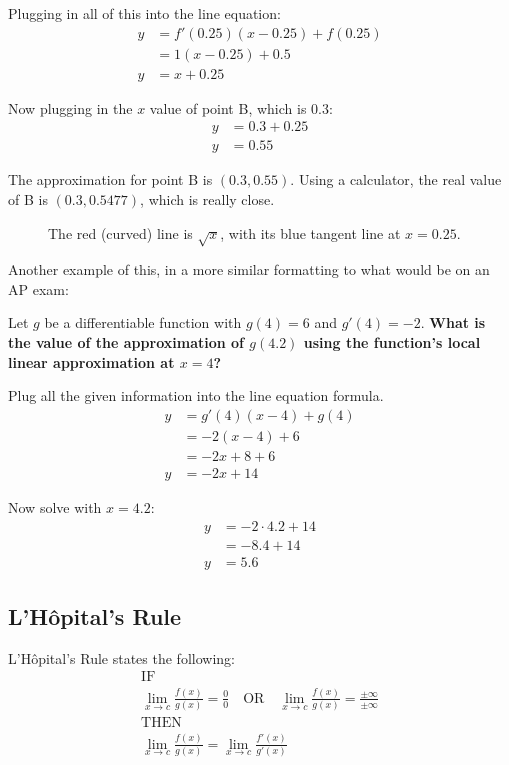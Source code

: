 \documentclass[12pt]{article}
\begin{document}
\noindent Plugging in all of this into the line equation:
\begin{align*}
    y & = f'(0.25)(x-0.25) + f(0.25) \\
      & = 1(x-0.25) + 0.5            \\
    y & = x+0.25
\end{align*}

\noindent Now plugging in the $x$ value of point B, which is $0.3$:
\begin{align*}
    y & = 0.3 + 0.25 \\
    y & = 0.55
\end{align*}

The approximation for point B is $(0.3, 0.55)$. Using a calculator, the real value of B is $(0.3, 0.5477)$, which is really close.

\begin{figure}[h]
    \begin{center}
        \caption{The red (curved) line is $\sqrt{x}$, with its blue tangent line at $x=0.25$.}
        \label{fig:locallinapprox}
    \end{center}
\end{figure}

Another example of this, in a more similar formatting to what would be on an AP exam:

\noindent Let $g$ be a differentiable function with $g(4) = 6$ and $g'(4) = -2$. \textbf{What is the value of the approximation of $g(4.2)$ using the function's local linear approximation at $x=4$?}

\begin{center}
    Plug all the given information into the line equation formula.
    \begin{align*}
        y & = g'(4)(x-4) + g(4) \\
          & = -2(x-4) + 6       \\
          & = -2x + 8 + 6       \\
        y & = -2x + 14
    \end{align*}

    Now solve with $x=4.2$:
    \begin{align*}
        y & = -2 \cdot 4.2 + 14 \\
          & = -8.4 + 14         \\
        y & = 5.6
    \end{align*}
\end{center}

\subsection{L'Hôpital's Rule} %
\noindent L'Hôpital's Rule states the following:
\begin{gather*}
    \text{IF} \\
    \lim_{x \to c} \frac{f(x)}{g(x)} = \frac{0}{0} \quad \text{OR} \quad \lim_{x \to c} \frac{f(x)}{g(x)} = \frac{\pm \infty}{\pm \infty} \\[6pt]
    \text{THEN} \\
    \lim_{x \to c} \frac{f(x)}{g(x)} = \lim_{x \to c} \frac{f'(x)}{g'(x)}
\end{gather*}
\end{document}
